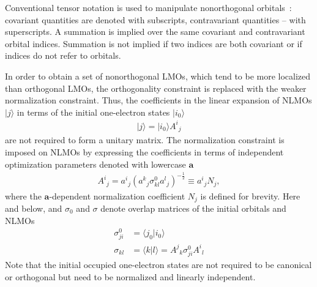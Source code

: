 \documentclass[aps,prl,reprint,amsmath,amssymb]{revtex4-1}
\newcommand{\ket}[1]{\ensuremath{\vert #1 \rangle}}
\newcommand{\braket}[2]{\ensuremath{\langle #1 \vert #2 \rangle}} %
\begin{document}
Conventional tensor notation is used to manipulate nonorthogonal orbitals~\cite{head1998tensor}: covariant quantities are denoted with subscripts, contravariant quantities -- with superscripts. A summation is implied over the same covariant and contravariant orbital indices. Summation is not implied if two indices are both covariant or if indices do not refer to orbitals.

In order to obtain a set of nonorthogonal LMOs, which tend to be more localized than orthogonal LMOs, the orthogonality constraint is replaced with the weaker normalization constraint. Thus, the coefficients in the linear expansion of NLMOs $\ket{j}$ in terms of the initial one-electron states $\ket{i_0}$
%
\begin{equation}
\begin{split}
\ket{j} = \ket{i_0} {A^i}_j 
\end{split}
\end{equation}
%
are not required to form a unitary matrix. The normalization constraint is imposed on NLMOs by expressing the coefficients in terms of independent optimization parameters denoted with lowercase $\mathbf{a}$
%
\begin{equation}
\begin{split}
{A^i}_j = {a^i}_{j} ({a^k}_{j} \sigma^0_{kl}{a^l}_{j})^{-\frac{1}{2}} \equiv {a^i}_{j} N_j ,
\end{split}
\end{equation}
%
where the $\mathbf{a}$-dependent normalization coefficient $N_j$ is defined for brevity. Here and below, and $\sigma_0$ and $\sigma$ denote overlap matrices of the initial orbitals and NLMOs
%
\begin{equation} \label{eq:sigma}
\begin{split}
\sigma_{ji}^0 &= \braket{j_0}{i_0} \\
\sigma_{kl} &= \braket{k}{l} = {A^j}_k \sigma_{ji}^0{A^i}_l
\end{split}
\end{equation}
%
Note that the initial occupied one-electron states are not required to be canonical or orthogonal but need to be normalized and linearly independent. 
\end{document}

